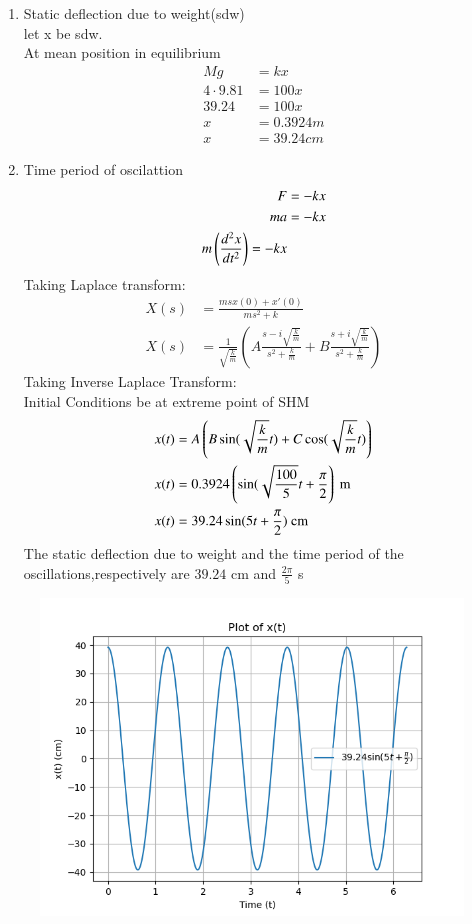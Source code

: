 \documentclass[journal,12pt,twocolumn]{IEEEtran}
\theoremstyle{remark}
\begin{document}
\begin{enumerate}
    \item Static deflection due to weight(sdw)\\
    let x be sdw.\\
    At mean position in equilibrium\\
    \begin{align}
        Mg&=kx\\
        4\cdot9.81&=100x\\
        39.24&=100x\\
        x&=0.3924m\\
        x&=39.24cm
    \end{align}
     \item Time period of oscilattion\\
     \begin{align}
           F&=-kx\\
           ma&=-kx\\
           m\left(\frac{d^2x}{dt^2}\right)=-kx
     \end{align}
     Taking Laplace transform:
     \begin{align}
X(s) &= \frac{ms x(0) + x'(0)}{ms^2 + k} \\
       X(s) &= \frac{1}{\sqrt{\frac{k}{m}}} \left( A \frac{s - i \sqrt{\frac{k}{m}}}{s^2 + \frac{k}{m}} + B \frac{s + i \sqrt{\frac{k}{m}}}{s^2 + \frac{k}{m}} \right) 
     \end{align}
     Taking Inverse Laplace Transform:\\
     Initial Conditions be at extreme point of SHM
     \begin{align}
      x(t) &=A \left( B \sin(\sqrt{\frac{k}{m}}t) + C\cos(\sqrt{\frac{k}{m}}t) \right)\\
      x(t)&=0.3924\left(\sin(\sqrt{\frac{100}{5}}t+\frac{\pi}{2}\right)\text{ m}\\
      x(t)&=39.24 \sin(5t+\frac{\pi}{2}) \text{ cm}
     \end{align}
    The static deflection due to weight and the time period of the oscillations,respectively are $39.24$ cm and $\frac{2\pi}{5}$ s
\end{enumerate}
\begin{figure}[h!]
    \centering
    \includegraphics[width = \columnwidth]{figs/xe_71_f2.png}
\end{figure}
\end{document}
